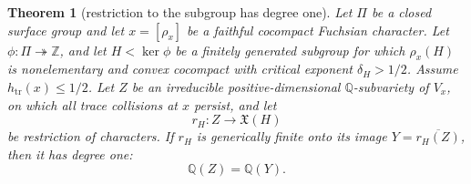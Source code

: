 \documentclass[11pt,reqno]{amsart}
\newtheorem{theorem}{Theorem}[section]
\theoremstyle{definition}
\theoremstyle{remark}
\newcommand{\Q}{\mathbb Q}
\newcommand{\Z}{\mathbb Z}
\newcommand{\Tr}{\operatorname{tr}}
\begin{document}
\begin{theorem}[restriction to the subgroup has degree one]
\label{thm:restriction-birational}
Let \(\Pi\) be a closed surface group and let
\(x=[\rho_x]\) be a faithful cocompact Fuchsian character.  Let
\(\phi\colon\Pi\twoheadrightarrow\Z\), and let
\(H<\ker\phi\) be a finitely generated subgroup for which
\(\rho_x(H)\) is nonelementary and convex cocompact with critical exponent
\(\delta_H>1/2\).  Assume \(h_{\Tr}(x)\le1/2\).  Let \(Z\) be an irreducible
positive-dimensional \(\Q\)-subvariety of \(V_x\), on which all trace
collisions at \(x\) persist, and let
\[
 r_H\colon Z\longrightarrow\mathfrak X(H)
\]
be restriction of characters.  If \(r_H\) is generically finite onto its
image \(Y=\overline{r_H(Z)}\), then it has degree one:
\[
 \Q(Z)=\Q(Y).
\]
\end{theorem}
\end{document}
